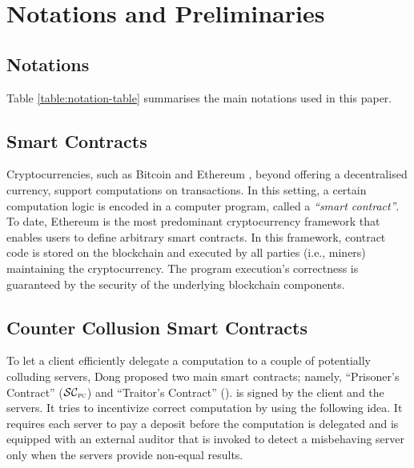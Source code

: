 

\vs

\section{Notations and Preliminaries}

\vs
\subsection{Notations}

Table \ref{table:notation-table} summarises the main notations used in this paper. 

\vs
\vs
\vs


\vs
\vs




\vs 
\vs

\subsection{Smart Contracts}

Cryptocurrencies, such as Bitcoin \cite{bitcoin} and Ethereum \cite{ethereum}, beyond offering a decentralised currency,  support computations on transactions. In this setting, a certain computation logic is encoded in a computer program, called a \emph{``smart contract''}. To date, Ethereum is the most predominant cryptocurrency framework that enables users to define arbitrary smart contracts. In this framework,  contract code is stored on the blockchain and executed by all parties (i.e., miners) maintaining the cryptocurrency. The program execution's correctness is guaranteed by the security of the underlying blockchain components. %

\vs
\vs

\subsection{Counter Collusion Smart Contracts}\label{Counter-Collusion-Smart-Contracts}

To let a client efficiently delegate a computation to a  couple of potentially colluding servers, Dong   \et \cite{dong2017betrayal} proposed two main smart contracts; namely, ``Prisoner's Contract'' ($\SCpc$) and ``Traitor's Contract'' (\SCtc).  
%
\SCpc is signed by the client and the servers. It tries to incentivize correct computation by using the following idea. It requires each server to pay a deposit before the computation is delegated and is equipped with an external auditor that is invoked to detect a misbehaving server only when the servers provide non-equal results. 



